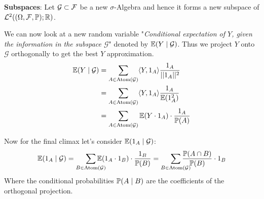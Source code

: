 \textbf{Subspaces}: Let \(\mathcal{G} \subset \F\) be a new \(\sigma\)-Algebra and hence it forms a new subspace of \(\L^2((\O, \F, \P); \R)\).

\pagebreak
We can now look at a new random variable "\textit{Conditional expectation of \(Y\), given the information in the subspace \(\mathcal{G}\)}" denoted by \(\E(Y \mid \mathcal{G})\). Thus we project \(Y\) onto \(\mathcal{G}\) orthogonally to get the best \(Y\) approximation.
\begin{align*}
  \E(Y \mid \mathcal{G}) &= \sum_{A \in \Atom(\mathcal{G})}\langle Y, \I_A \rangle \frac{\I_A}{||\I_A||^2} \\
  &= \sum_{A \in \Atom(\mathcal{G})}\langle Y, \I_A \rangle \frac{\I_A}{\E(\I_A^2)}  \\
  &= \sum_{A \in \Atom(\mathcal{G})} \E(Y \cdot \I_A) \cdot \frac{\I_A}{\P(A)}
\end{align*}

Now for the final climax let's consider \(\E(\I_A \mid \mathcal{G})\):
\[\E(\I_A \mid \mathcal{G}) = \smashoperator[r]{\sum_{B \in \Atom(\mathcal{G})}} \E(\I_A \cdot \I_B) \cdot \frac{\I_B}{\P(B)} = \smashoperator[r]{\sum_{B \in \Atom(\mathcal{G})}} \frac{\P(A \cap B)}{\P(B)} \cdot \I_B\]
Where the conditional probabilities \(\P(A \mid B)\) are the coefficients of the orthogonal projection.
